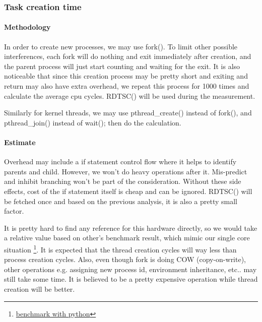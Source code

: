 \subsubsection{Task creation time}


\paragraph{Methodology}

In order to create new processes, we may use fork(). To limit other possible interferences, each fork will do nothing and exit immediately after creation, and the parent process will just start counting and waiting for the exit. It is also noticeable that since this creation process may be pretty short and exiting and return may also have extra overhead, we repeat this process for 1000 times and calculate the average cpu cycles. RDTSC() will be used during the measurement.

Similarly for kernel threads, we may use pthread\_create() instead of fork(), and pthread\_join() instead of wait(); then do the calculation.

\paragraph{Estimate}

Overhead may include a if statement control flow where it helps to identify parents and child. However, we won't do heavy operations after it. Mis-predict and inhibit branching won't be part of the consideration. Without these side effects, cost of the if statement itself is cheap and can be ignored. RDTSC() will be fetched once and based on the previous analysis, it is also a pretty small factor. 

It is pretty hard to find any reference for this hardware directly, so we would take a relative value based on other's benchmark result, which mimic our single core situation \footnote{\href{https://stackoverflow.com/questions/52175375/overhead-in-creating-a-thread-vs-process-on-linux}{benchmark with python}}. It is expected that the thread creation cycles will way less than process creation cycles. Also, even though fork is doing COW (copy-on-write), other operations e.g. assigning new process id, environment inheritance, etc.. may still take some time. It is believed to be a pretty expensive operation while thread creation will be better.

